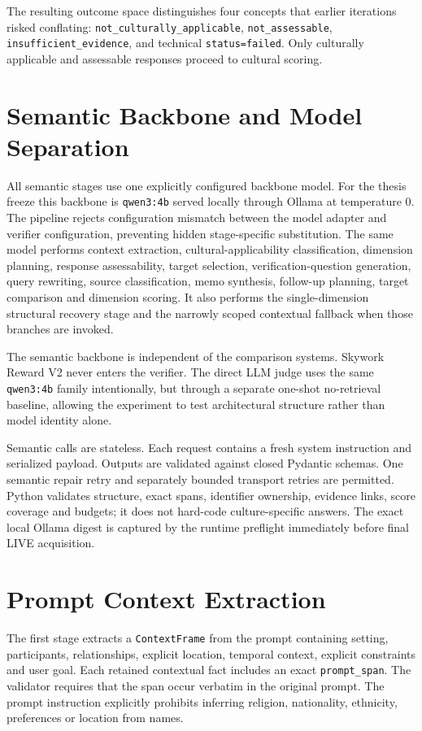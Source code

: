 The resulting outcome space distinguishes four concepts that earlier iterations risked conflating: \texttt{not\_culturally\_applicable}, \texttt{not\_assessable}, \texttt{insufficient\_evidence}, and technical \texttt{status=failed}. Only culturally applicable and assessable responses proceed to cultural scoring.

\section{Semantic Backbone and Model Separation}

All semantic stages use one explicitly configured backbone model. For the thesis freeze this backbone is \texttt{qwen3:4b} served locally through Ollama at temperature 0. The pipeline rejects configuration mismatch between the model adapter and verifier configuration, preventing hidden stage-specific substitution. The same model performs context extraction, cultural-applicability classification, dimension planning, response assessability, target selection, verification-question generation, query rewriting, source classification, memo synthesis, follow-up planning, target comparison and dimension scoring. It also performs the single-dimension structural recovery stage and the narrowly scoped contextual fallback when those branches are invoked.

The semantic backbone is independent of the comparison systems. Skywork Reward V2 never enters the verifier. The direct LLM judge uses the same \texttt{qwen3:4b} family intentionally, but through a separate one-shot no-retrieval baseline, allowing the experiment to test architectural structure rather than model identity alone.

Semantic calls are stateless. Each request contains a fresh system instruction and serialized payload. Outputs are validated against closed Pydantic schemas. One semantic repair retry and separately bounded transport retries are permitted. Python validates structure, exact spans, identifier ownership, evidence links, score coverage and budgets; it does not hard-code culture-specific answers. The exact local Ollama digest is captured by the runtime preflight immediately before final LIVE acquisition.

\section{Prompt Context Extraction}

The first stage extracts a \texttt{ContextFrame} from the prompt containing setting, participants, relationships, explicit location, temporal context, explicit constraints and user goal. Each retained contextual fact includes an exact \texttt{prompt\_span}. The validator requires that the span occur verbatim in the original prompt. The prompt instruction explicitly prohibits inferring religion, nationality, ethnicity, preferences or location from names.

